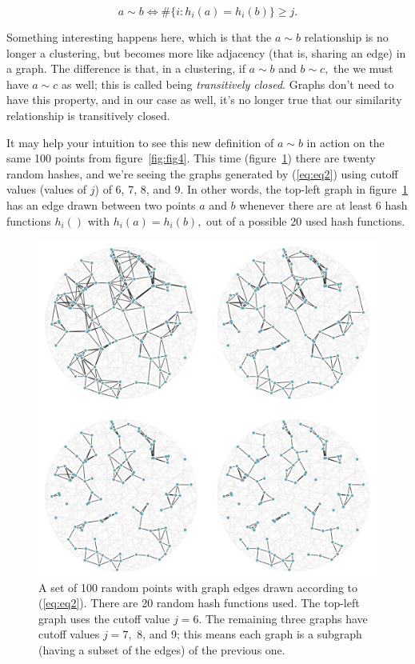 \documentclass[20pt,]{extarticle}
\begin{document}
\begin{equation} a \sim b \iff \#\{i: h_i(a) = h_i(b)\} \ge j. \label{eq:eq2}\end{equation}

Something interesting happens here, which is that the \(a \sim b\)
relationship is no longer a clustering, but becomes more like adjacency
(that is, sharing an edge) in a graph. The difference is that, in a
clustering, if \(a\sim b\) and \(b\sim c,\) the we must have \(a\sim c\)
as well; this is called being \emph{transitively closed}. Graphs don't
need to have this property, and in our case as well, it's no longer true
that our similarity relationship is transitively closed.

It may help your intuition to see this new definition of \(a\sim b\) in
action on the same 100 points from figure~\ref{fig:fig4}. This time
(figure~\ref{fig:fig5}) there are twenty random hashes, and we're seeing
the graphs generated by (\ref{eq:eq2}) using cutoff values (values of
\(j\)) of 6, 7, 8, and 9. In other words, the top-left graph in
figure~\ref{fig:fig5} has an edge drawn between two points \(a\) and
\(b\) whenever there are at least 6 hash functions \(h_i()\) with
\(h_i(a) = h_i(b),\) out of a possible 20 used hash functions.

\begin{figure}
\centering
\includegraphics{images/lsh_image5.png}
\caption{A set of 100 random points with graph edges drawn according to
(\ref{eq:eq2}). There are 20 random hash functions used. The top-left
graph uses the cutoff value \(j=6.\) The remaining three graphs have
cutoff values \(j=7,\) 8, and 9; this means each graph is a subgraph
(having a subset of the edges) of the previous one.}\label{fig:fig5}
\end{figure}
\end{document}

